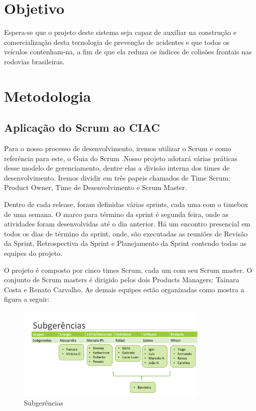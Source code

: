 \section{Objetivo}

Espera-se que o projeto deste sistema seja capaz de auxiliar na construção e comercialização desta tecnologia de prevenção de acidentes e que todos os veículos contenham-na, a fim de que ela reduza os índices de colisões frontais nas rodovias brasileiras.

\section{Metodologia}

\subsection{Aplicação do Scrum ao CIAC}

Para o nosso processo de desenvolvimento, iremos utilizar o Scrum e como referência para este, o Guia do Scrum \cite{guiaScrum}.Nosso projeto adotará várias práticas desse modelo de gerenciamento, dentre elas a divisão interna dos times de desenvolvimento. Iremos dividir em três papeis chamados de Time Scrum: Product Owner, Time de Desenvolvimento e Scrum Master. 

Dentro de cada release, foram definidas várias sprints, cada uma com o timebox de uma semana. O marco para término da sprint é segunda feira, onde as atividades foram desenvolvidas até o dia anterior. Há um encontro presencial em todos os dias de término da sprint, onde, são executadas as reuniões de Revisão da Sprint, Retrospectiva da Sprint e Planejamento da Sprint contendo todas as equipes do projeto.

O projeto é composto por cinco times Scrum, cada um com seu Scrum master. O conjunto de Scrum masters é dirigido pelos dois Products Managers: Tainara Costa e Renato Carvalho. As demais equipes estão organizadas como mostra a figura a seguir: 

\begin{figure}[h!]
  \centering
  \includegraphics[width=350px, scale=0.5]{figuras/time}
  \caption{Subgerências}
\label{fig:time}
\end{figure}

